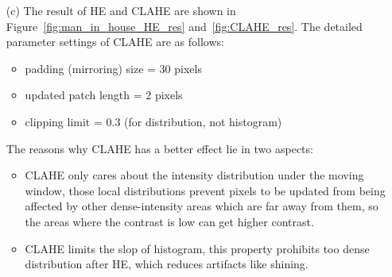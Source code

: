 \documentclass[11pt,letterpaper]{article}
\begin{document}
\begin{itemize}
	\item [(c)] The result of HE and CLAHE are shown in Figure~\ref{fig:man_in_house_HE_res} and~\ref{fig:CLAHE_res}. 
	The detailed parameter settings of CLAHE are as follows:
	\begin{itemize}
		\item padding (mirroring) size = 30 pixels
		\item updated patch length = 2 pixels
		\item clipping limit = 0.3 (for distribution, not histogram)
	\end{itemize}
	The reasons why CLAHE has a better effect lie in two aspects:
	\begin{itemize}
		\item CLAHE only cares about the intensity distribution under the moving window, those local 
		distributions prevent pixels to be updated from being affected by other dense-intensity areas which are far away from them,
		so the areas where the contrast is low can get higher contrast.
		\item CLAHE limits the slop of histogram, this property prohibits too dense distribution after HE, which reduces artifacts like shining. 
	\end{itemize}
	\begin{figure}
		\centering
		\caption{}
	\end{figure}
\end{itemize}
\clearpage
\end{document}
